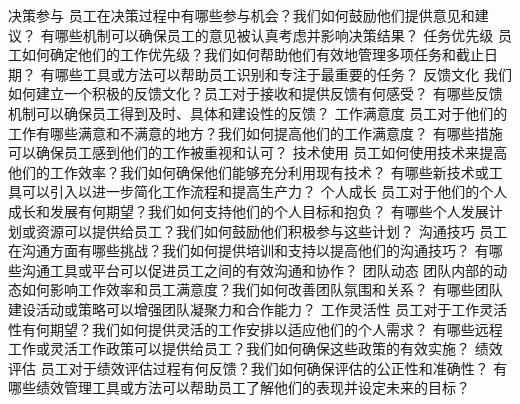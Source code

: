 \documentclass[12pt]{book}
\begin{document}
决策参与
员工在决策过程中有哪些参与机会？我们如何鼓励他们提供意见和建议？
有哪些机制可以确保员工的意见被认真考虑并影响决策结果？
任务优先级
员工如何确定他们的工作优先级？我们如何帮助他们有效地管理多项任务和截止日期？
有哪些工具或方法可以帮助员工识别和专注于最重要的任务？
反馈文化
我们如何建立一个积极的反馈文化？员工对于接收和提供反馈有何感受？
有哪些反馈机制可以确保员工得到及时、具体和建设性的反馈？
工作满意度
员工对于他们的工作有哪些满意和不满意的地方？我们如何提高他们的工作满意度？
有哪些措施可以确保员工感到他们的工作被重视和认可？
技术使用
员工如何使用技术来提高他们的工作效率？我们如何确保他们能够充分利用现有技术？
有哪些新技术或工具可以引入以进一步简化工作流程和提高生产力？
个人成长
员工对于他们的个人成长和发展有何期望？我们如何支持他们的个人目标和抱负？
有哪些个人发展计划或资源可以提供给员工？我们如何鼓励他们积极参与这些计划？
沟通技巧
员工在沟通方面有哪些挑战？我们如何提供培训和支持以提高他们的沟通技巧？
有哪些沟通工具或平台可以促进员工之间的有效沟通和协作？
团队动态
团队内部的动态如何影响工作效率和员工满意度？我们如何改善团队氛围和关系？
有哪些团队建设活动或策略可以增强团队凝聚力和合作能力？
工作灵活性
员工对于工作灵活性有何期望？我们如何提供灵活的工作安排以适应他们的个人需求？
有哪些远程工作或灵活工作政策可以提供给员工？我们如何确保这些政策的有效实施？
绩效评估
员工对于绩效评估过程有何反馈？我们如何确保评估的公正性和准确性？
有哪些绩效管理工具或方法可以帮助员工了解他们的表现并设定未来的目标？
\end{document}
